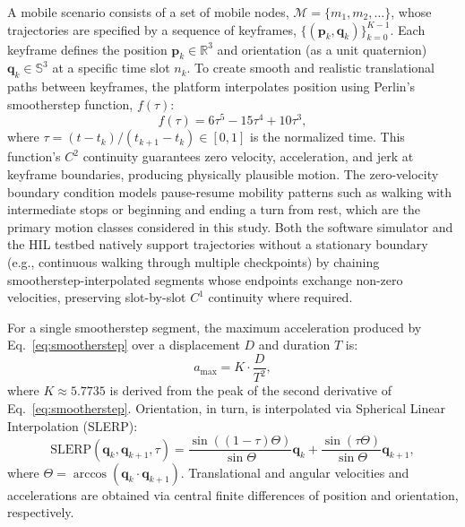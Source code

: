 \documentclass[fleqn,10pt]{wlscirep}
\newcommand{\rev}[1]{#1}
\begin{document}
A mobile scenario consists of a set of mobile nodes, $\mathcal{M} = \{m_1, m_2, \dots\}$, whose trajectories are specified by a sequence of keyframes, $\{(\mathbf{p}_k, \mathbf{q}_k)\}_{k=0}^{K-1}$. Each keyframe defines the position $\mathbf{p}_k \in \mathbb{R}^3$ and orientation (as a unit quaternion) $\mathbf{q}_k \in \mathbb{S}^3$ at a specific time slot $n_k$. To create smooth and realistic translational paths between keyframes, the platform interpolates position using Perlin's smootherstep function\cite{Perlin2002}, $f(\tau)$:
\begin{equation}
f(\tau) = 6\tau^5 - 15\tau^4 + 10\tau^3,
\label{eq:smootherstep}
\end{equation}
where $\tau = (t - t_k) / (t_{k+1} - t_k) \in [0, 1]$ is the normalized time. This function's $C^2$ continuity guarantees zero velocity, acceleration, and jerk at keyframe boundaries, producing physically plausible motion. \rev{The zero-velocity boundary condition models pause-resume mobility patterns such as walking with intermediate stops or beginning and ending a turn from rest, which are the primary motion classes considered in this study. Both the software simulator and the HIL testbed natively support trajectories without a stationary boundary (e.g., continuous walking through multiple checkpoints) by chaining smootherstep-interpolated segments whose endpoints exchange non-zero velocities, preserving slot-by-slot $C^1$ continuity where required.}

For a single smootherstep segment, the maximum acceleration produced by Eq.~\eqref{eq:smootherstep} over a displacement $D$ and duration $T$ is:
\begin{equation}
    a_{\max} = K \cdot \frac{D}{T^2},
\end{equation}
where $K \approx 5.7735$ is derived from the peak of the second derivative of Eq.~\eqref{eq:smootherstep}. Orientation, in turn, is interpolated via Spherical Linear Interpolation (SLERP)\cite{Shoemake1985SLERP}:
\begin{equation}
    \text{SLERP}(\mathbf{q}_k, \mathbf{q}_{k+1}, \tau) = \frac{\sin((1-\tau)\Theta)}{\sin\Theta}\mathbf{q}_k + \frac{\sin(\tau\Theta)}{\sin\Theta}\mathbf{q}_{k+1},
\end{equation}
where $\Theta = \arccos(\mathbf{q}_k \cdot \mathbf{q}_{k+1})$. Translational and angular velocities and accelerations are obtained via central finite differences of position and orientation, respectively.
\end{document}
